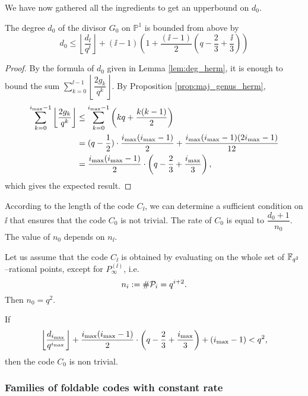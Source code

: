 \documentclass[10pt]{article}
\begin{document}
We have now gathered all the ingredients to get an upperbound on $d_0$.

\begin{corollary}
The degree $d_0$ of the divisor $G_0$ on $\mathbb{P}^1$ is bounded from above by 
\[d_0 \leq \left\lfloor \dfrac{d_{\ii}}{q^{\ii}}\right\rfloor + (\ii-1)\left( 1+\dfrac{(\ii-1)}{2} \left(q-\frac{2}{3} + \frac{\ii}{3}\right) \right) \]
\end{corollary}

\begin{proof}
	By the formula of $d_0$ given in Lemma \ref{lem:deg_herm}, it is enough to bound the sum $\sum\limits_{k=0}^{\ii-1} \left\lfloor \dfrac{2g_k}{q^k}\right\rfloor$. By Proposition \ref{prop:maj_genus_herm},
\begin{align*}
\sum\limits_{k=0}^{i_{\rm{max}}-1} \left\lfloor \dfrac{2g_k}{q^k}\right\rfloor & \leq  \sum\limits_{k=0}^{i_{\rm{max}}-1} \left(kq + \dfrac{k(k-1)}{2}\right)  \\
	&= (q-\frac{1}{2}) \cdot \dfrac{i_{\rm{max}}(i_{\rm{max}}-1)}{2} + \dfrac{i_{\rm{max}}(i_{\rm{max}}-1)(2i_{\rm{max}}-1)}{12} \\
	&= \dfrac{i_{\rm{max}}(i_{\rm{max}}-1)}{2}\cdot \left(q-\frac{2}{3} + \frac{i_{\rm{max}}}{3}\right),
\end{align*}
which gives the expected result.
\end{proof}

According to the length of the code $C_{\ii}$, we can determine a sufficient condition on $\ii$ that ensures that the code $C_0$ is not trivial. The rate of $C_0$ is equal to $\dfrac{d_0+1}{n_0}$. The value of $n_0$ depends on $n_{\ii}$.

Let us assume that the code $C_{\ii}$ is obtained by evaluating on the whole set of $\mathbb{F}_{q^2}$--rational points, except for $P_\infty^{(\ii)}$, i.e. 
\[n_i := \#\mathcal{P}_i = q^{i+2}.\]
Then $n_0=q^2$. 

\begin{corollary}\label{cor:cdt_deg_herm}
If 
\[ \left\lfloor \dfrac{d_{i_{\rm{max}}}}{q^{i_{\rm{max}}}}\right\rfloor + \dfrac{i_{\rm{max}}(i_{\rm{max}}-1)}{2}\cdot \left(q-\frac{2}{3} + \frac{i_{\rm{max}}}{3}\right) + (i_{\rm{max}}-1) < q^2,\]
then the code $C_0$ is non trivial.
\end{corollary}

\subsubsection{Families of foldable codes with constant rate}

\end{document}
